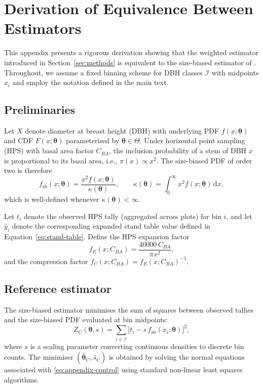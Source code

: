 \section{Derivation of Equivalence Between Estimators}
\label{sec:appendix-equivalence}

This appendix presents a rigorous derivation showing that the weighted estimator introduced
in Section~\ref{sec:methods} is equivalent to the size-biased estimator of
\citet{van1986, ducey2015}. Throughout, we assume a fixed binning scheme for
DBH classes $\mathcal{I}$ with midpoints $x_i$ and employ the notation defined
in the main text.

\subsection{Preliminaries}

Let $X$ denote diameter at breast height (DBH) with underlying PDF
$f(x;\boldsymbol{\theta})$ and CDF $F(x;\boldsymbol{\theta})$ parameterised by
$\boldsymbol{\theta}\in\Theta$. Under horizontal point sampling (HPS) with basal
area factor $C_{BA}$, the inclusion probability of a stem of DBH $x$ is
proportional to its basal area, i.e., $\pi(x)\propto x^2$. The size-biased PDF
of order two is therefore
\begin{equation}
  f_{\mathrm{sb}}(x;\boldsymbol{\theta})
  =
  \frac{x^{2} f(x;\boldsymbol{\theta})}{\kappa(\boldsymbol{\theta})},
  \qquad
  \kappa(\boldsymbol{\theta})
  =
  \int_{0}^{\infty} x^{2} f(x;\boldsymbol{\theta})\,\mathrm{d}x,
\end{equation}
which is well-defined whenever $\kappa(\boldsymbol{\theta}) < \infty$.

Let $t_i$ denote the observed HPS tally (aggregated across plots) for bin $i$,
and let $\hat{y}_i$ denote the corresponding expanded stand table value defined
in Equation~\eqref{eq:stand-table}. Define the HPS expansion factor
\begin{equation}
  f_E(x; C_{BA}) = \frac{40000 \, C_{BA}}{\pi x^2},
\end{equation}
and the compression factor $f_C(x; C_{BA}) = f_E(x; C_{BA})^{-1}$.

\subsection{Reference estimator}

The size-biased estimator minimises the sum of squares between observed tallies
and the size-biased PDF evaluated at bin midpoints:
\begin{equation}
  Z_{\mathrm{C}}(\boldsymbol{\theta}, s)
  =
  \sum_{i \in \mathcal{I}}
  \Big[t_i - s\, f_{\mathrm{sb}}(x_i; \boldsymbol{\theta})\Big]^2,
  \label{eq:appendix-control}
\end{equation}
where $s$ is a scaling parameter converting continuous densities to discrete
bin counts. The minimiser $(\hat{\boldsymbol{\theta}}_{\mathrm{C}},\hat{s}_{\mathrm{C}})$ is
obtained by solving the normal equations associated with
\eqref{eq:appendix-control} using standard non-linear least squares algorithms.

